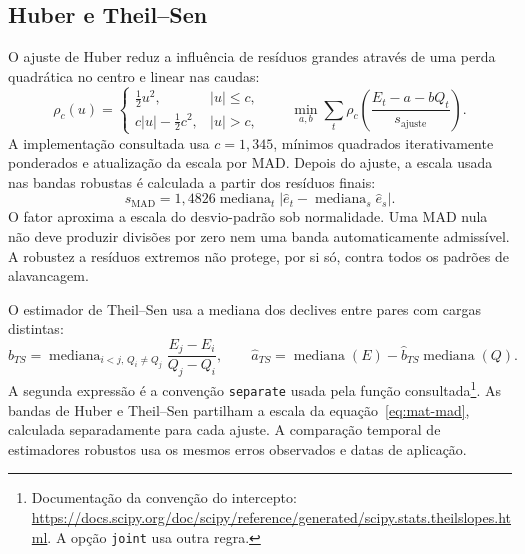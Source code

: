 \subsection{Huber e Theil--Sen}
\label{sec:mat-robustos}
O ajuste de Huber reduz a influência de resíduos grandes através de uma perda quadrática no centro e linear nas caudas\parencite{Huber1964,HollandWelsch1977}:
\begin{equation}
\rho_c(u)=\begin{cases}\tfrac12u^2,&|u|\leq c,\\c|u|-\tfrac12c^2,&|u|>c,\end{cases}
\qquad \min_{a,b}\sum_t\rho_c\!\left(\frac{E_t-a-bQ_t}{s_{\mathrm{ajuste}}}\right).
\label{eq:mat-huber}
\end{equation}
A implementação consultada usa $c=1{,}345$, mínimos quadrados iterativamente ponderados e atualização da escala por MAD. Depois do ajuste, a escala usada nas bandas robustas é calculada a partir dos resíduos finais:
\begin{equation}
s_{\mathrm{MAD}}=1{,}4826\operatorname{mediana}_t
\left|\widehat e_t-\operatorname{mediana}_s\widehat e_s\right|.
\label{eq:mat-mad}
\end{equation}
O fator aproxima a escala do desvio-padrão sob normalidade. Uma MAD nula não deve produzir divisões por zero nem uma banda automaticamente admissível. A robustez a resíduos extremos não protege, por si só, contra todos os padrões de alavancagem.

O estimador de Theil--Sen usa a mediana dos declives entre pares com cargas distintas\parencite{Sen1968}:
\begin{equation}
\widehat b_{TS}=\operatorname{mediana}_{i<j,\,Q_i\neq Q_j}
\frac{E_j-E_i}{Q_j-Q_i},
\qquad
\widehat a_{TS}=\operatorname{mediana}(E)-\widehat b_{TS}\operatorname{mediana}(Q).
\label{eq:mat-theil-sen}
\end{equation}
A segunda expressão é a convenção \texttt{separate} usada pela função consultada\footnote{Documentação da convenção do intercepto: \url{https://docs.scipy.org/doc/scipy/reference/generated/scipy.stats.theilslopes.html}. A opção \texttt{joint} usa outra regra.}. As bandas de Huber e Theil--Sen partilham a escala da equação~\ref{eq:mat-mad}, calculada separadamente para cada ajuste. A comparação temporal de estimadores robustos usa os mesmos erros observados e datas de aplicação.

